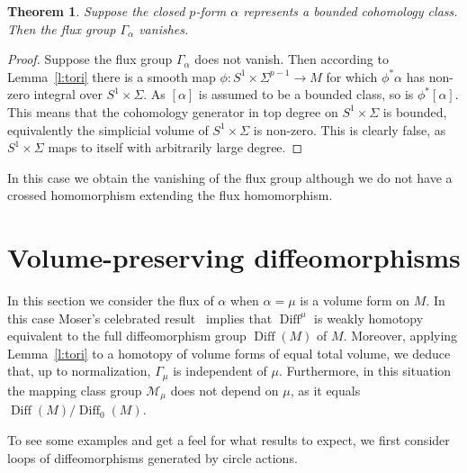 \documentclass[12pt]{amsart}
\newtheorem{theorem}{Theorem}%
\theoremstyle{definition}
\theoremstyle{remark}
\def\M{{\mathcal M}}
\newcommand\Diff{\operatorname{Diff}}
\begin{document}
\begin{theorem}\label{t:bounded}
Suppose the closed $p$-form $\alpha$ represents a bounded cohomology class. 
Then the flux group $\Gamma_{\alpha}$ vanishes.
\end{theorem}
\begin{proof}
Suppose the flux group $\Gamma_{\alpha}$ does not vanish. Then according
to Lemma~\ref{l:tori} there is a smooth map $\phi\colon S^1\times\Sigma^{p-1}\rightarrow M$
for which $\phi^*\alpha$ has non-zero integral over $S^1\times\Sigma$. As $[\alpha]$
is assumed to be a bounded class, so is $\phi^*[\alpha]$. This means that the cohomology
generator in top degree on $S^1\times\Sigma$ is bounded, equivalently the simplicial
volume of $S^1\times\Sigma$ is non-zero. This is clearly false, as $S^1\times\Sigma$
maps to itself with arbitrarily large degree.
\end{proof}
In this case we obtain the vanishing of the flux group although we do not have a crossed
homomorphism extending the flux homomorphism.
    
\section{Volume-preserving diffeomorphisms}\label{s:volume}

In this section we consider the flux of $\alpha$ when $\alpha = \mu$ is 
a volume form on $M$. In this case Moser's celebrated result~\cite{Moser} 
implies that $\Diff^{\mu}$ is weakly homotopy equivalent to the full 
diffeomorphism group $\Diff (M)$ of $M$. Moreover, applying 
Lemma~\ref{l:tori} to a homotopy of volume forms of equal total 
volume, we deduce that, up to normalization, $\Gamma_{\mu}$ is 
independent of $\mu$. Furthermore, in this situation the mapping 
class group $\M_{\mu}$ does not depend on $\mu$, as it equals 
$\Diff (M)/\Diff_{0} (M)$.

To see some examples and get a feel for what results to expect, we 
first consider loops of diffeomorphisms generated by circle actions.
\end{document}
